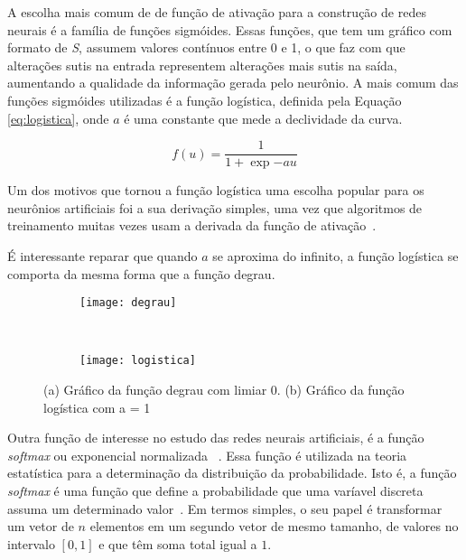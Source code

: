 A escolha mais comum de de função de ativação para a construção de redes neurais é a família de funções sigmóides. Essas funções, que tem um gráfico com formato de \textit{S}, assumem valores contínuos entre 0 e 1, o que faz com que alterações sutis na entrada representem alterações mais sutis na saída, aumentando a qualidade da informação gerada pelo neurônio. A mais comum das funções sigmóides utilizadas é a função logística, definida pela Equação \ref{eq:logistica}, onde $a$ é uma constante que mede a declividade da curva.

\begin{equation}
	f(u) = \frac{1}{1 + \exp{-au}}
\label{eq:logistica}
\end{equation}

Um dos motivos que tornou a função logística uma escolha popular para os neurônios artificiais foi a sua derivação simples, uma vez que algoritmos de treinamento muitas vezes usam a derivada da função de ativação~\cite{Kosabov}.

É interessante reparar que quando $a$ se aproxima do infinito, a função logística se comporta da mesma forma que a função degrau.

\begin{figure}
 \centering
\begin{subfigure}{.9\textwidth}
  \centering
  \texttt{[image: degrau]}
	\caption{}
	\label{fig:ativacao:sub:degrau}
	\centering
\end{subfigure}\
\begin{subfigure}{.9\textwidth}
  \centering
  \texttt{[image: logistica]}
	\caption{}
	\label{fig:ativacao:sub:logistica}
	\centering
\end{subfigure}
\caption{(a) Gráfico da função degrau com limiar 0. (b) Gráfico da função logística com a = 1}
\label{fig:ativacao}
\centering
\end{figure}

Outra função de interesse no estudo das redes neurais artificiais, é a função \textit{softmax} ou exponencial normalizada ~\cite{bishop2006pattern}. Essa função é utilizada na teoria estatística para a determinação da distribuição da probabilidade. Isto é, a função \textit{softmax} é uma função que define a probabilidade que uma varíavel discreta assuma um determinado valor~\cite{altmanbs}. Em termos simples, o seu papel é transformar um vetor de $n$ elementos em um segundo vetor de mesmo tamanho, de valores no intervalo $[0,1]$ e que têm soma total igual a $1$.

